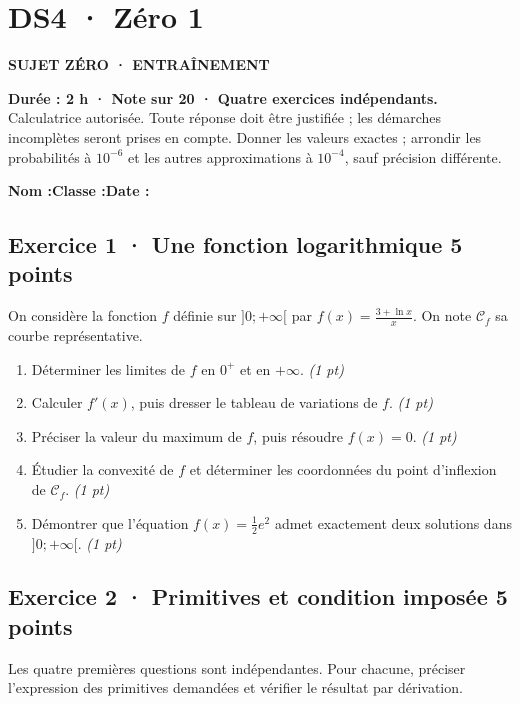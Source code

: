 \clearpage{}\label{sujet:6-1}

\section*{DS4 · Zéro 1}

{\sffamily\bfseries\color{teal}SUJET ZÉRO · ENTRAÎNEMENT\par}

\textbf{Durée : 2 h · Note sur 20 · Quatre exercices indépendants.}\\Calculatrice autorisée. Toute réponse doit être justifiée ; les démarches incomplètes seront prises en compte. Donner les valeurs exactes ; arrondir les probabilités à $10^{-6}$ et les autres approximations à $10^{-4}$, sauf précision différente.

\smallskip\textbf{Nom :}\enspace\dotfill\quad\textbf{Classe :}\enspace\dotfill\quad\textbf{Date :}\enspace\dotfill

\subsection*{Exercice 1 · Une fonction logarithmique \hfill 5 points}On considère la fonction $f$ définie sur $]0;+\infty[$ par $f(x)=\frac{3+\ln x}x$. On note $\mathcal C_f$ sa courbe représentative.

\begin{enumerate}

\item Déterminer les limites de $f$ en $0^+$ et en $+\infty$. \hfill\textit{(1 pt)}

\item Calculer $f' (x)$, puis dresser le tableau de variations de $f$. \hfill\textit{(1 pt)}

\item Préciser la valeur du maximum de $f$, puis résoudre $f(x)=0$. \hfill\textit{(1 pt)}

\item Étudier la convexité de $f$ et déterminer les coordonnées du point d'inflexion de $\mathcal C_f$. \hfill\textit{(1 pt)}

\item Démontrer que l'équation $f(x)=\frac12 e^{2}$ admet exactement deux solutions dans $]0;+\infty[$. \hfill\textit{(1 pt)}

\end{enumerate}

\subsection*{Exercice 2 · Primitives et condition imposée \hfill 5 points}Les quatre premières questions sont indépendantes. Pour chacune, préciser l'expression des primitives demandées et vérifier le résultat par dérivation.

